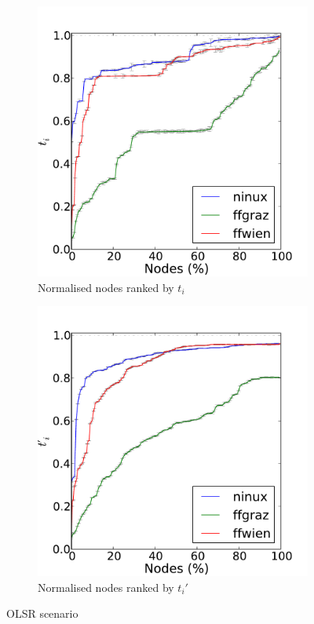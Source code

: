 \documentclass[a4paper,11pt,twoside,openright]{memoir}
\begin{document}
\begin{figure}[htb]
  \centering
  \begin{subfigure}[b]{0.49\textwidth}
    \includegraphics{graphs/all-mpr-Tc}
    \caption{Normalised nodes ranked by $t_i$}
    \label{fig:mp_olsr_t}
  \end{subfigure}
  \begin{subfigure}[b]{0.49\textwidth}
    \includegraphics{graphs/all-mpr-Rc}
    \caption{Normalised nodes ranked by $t_i'$}
    \label{fig:mp_olsr_r}
  \end{subfigure}
  \caption{OLSR scenario}
  \label{fig:mp_olsr}
\end{figure}
\end{document}
